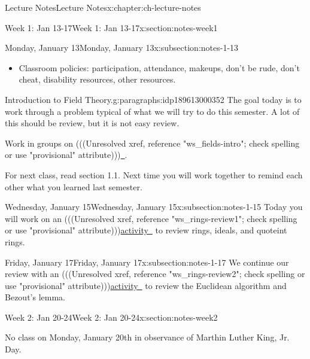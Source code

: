 \documentclass[oneside,11pt,]{book}
\begin{document}
\begin{chapterptx}{Lecture Notes}{}{Lecture Notes}{}{}{x:chapter:ch-lecture-notes}
\begin{sectionptx}{Week 1: Jan 13-17}{}{Week 1: Jan 13-17}{}{}{x:section:notes-week1}
\begin{subsectionptx}{Monday, January 13}{}{Monday, January 13}{}{}{x:subsection:notes-1-13}
\begin{itemize}[label=\textbullet]
%
\item{}Classroom policies: participation, attendance, makeups, don't be rude, don't cheat, disability resources, other resources.%
\end{itemize}
%
\begin{paragraphs}{Introduction to Field Theory.}{g:paragraphs:idp189613000352}%
The goal today is to work through a problem typical of what we will try to do this semester.  A lot of this should be review, but it is not easy review.%
\par
Work in groups on {(((Unresolved xref, reference "ws\_fields-intro"; check spelling or use "provisional" attribute)))}\hyperlink{}{~}.%
\par
For next class, read section 1.1.  Next time you will work together to remind each other what you learned last semester.%
\end{paragraphs}%
\end{subsectionptx}
%
%
\typeout{************************************************}
\typeout{************************************************}
%
\begin{subsectionptx}{Wednesday, January 15}{}{Wednesday, January 15}{}{}{x:subsection:notes-1-15}
Today you will work on an {(((Unresolved xref, reference "ws\_rings-review1"; check spelling or use "provisional" attribute)))}\hyperlink{}{activity~} to review rings, ideals, and quoteint rings.%
\end{subsectionptx}
%
%
\typeout{************************************************}
\typeout{************************************************}
%
\begin{subsectionptx}{Friday, January 17}{}{Friday, January 17}{}{}{x:subsection:notes-1-17}
We continue our review with an {(((Unresolved xref, reference "ws\_rings-review2"; check spelling or use "provisional" attribute)))}\hyperlink{}{activity~} to review the Euclidean algorithm and Bezout's lemma.%
\end{subsectionptx}
\end{sectionptx}
%
%
\typeout{************************************************}
\typeout{************************************************}
%
\begin{sectionptx}{Week 2: Jan 20-24}{}{Week 2: Jan 20-24}{}{}{x:section:notes-week2}
\begin{introduction}{}%
No class on Monday, January 20th in observance of Marthin Luther King, Jr. Day.%
\end{introduction}%

\end{sectionptx}
\end{chapterptx}
\end{document}
